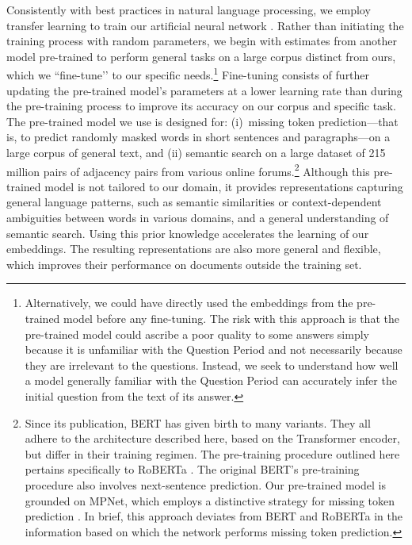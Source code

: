 {{Consistently with best practices in natural language processing, we employ transfer learning to train our artificial neural network \citep{ruder-etal-2019-transfer, Laurer_van_Atteveldt_Casas_Welbers_2024}. Rather than initiating the training process with random parameters, we begin with estimates from another model pre-trained to perform general tasks on a large corpus distinct from ours, which we ``fine-tune’’ to our specific needs.\footnote{Alternatively, we could have directly used the embeddings from the pre-trained model before any fine-tuning. The risk with this approach is that the pre-trained model could ascribe a poor quality to some answers simply because it is unfamiliar with the Question Period and not necessarily because they are irrelevant to the questions. Instead, we seek to understand how well a model generally familiar with the Question Period can accurately infer the initial question from the text of its answer.} Fine-tuning consists of further updating the pre-trained model’s parameters at a lower learning rate than during the pre-training process to improve its accuracy on our corpus and specific task. The pre-trained model we use is designed for: (i)~missing token prediction---that is, to predict randomly masked words in short sentences and paragraphs---on a large corpus of general text, and (ii) semantic search on a large dataset of 215 million pairs of adjacency pairs from various online forums.\footnote{Since its publication, BERT has given birth to many variants. They all adhere to the architecture described here, based on the Transformer encoder, but differ in their training regimen. The pre-training procedure outlined here pertains specifically to RoBERTa \citep{liu2019roberta}. The original BERT’s pre-training procedure also involves next-sentence prediction. Our pre-trained model is grounded on MPNet, which employs a distinctive strategy for missing token prediction \citep{MPNet}. In brief, this approach deviates from BERT and RoBERTa in the information based on which the network performs missing token prediction.} Although this pre-trained model is not tailored to our domain, it provides representations capturing general language patterns, such as semantic similarities or context-dependent ambiguities between words in various domains, and a general understanding of semantic search. Using this prior knowledge accelerates the learning of our embeddings. The resulting representations are also more general and flexible, which improves their performance on documents outside the training set.

}}
